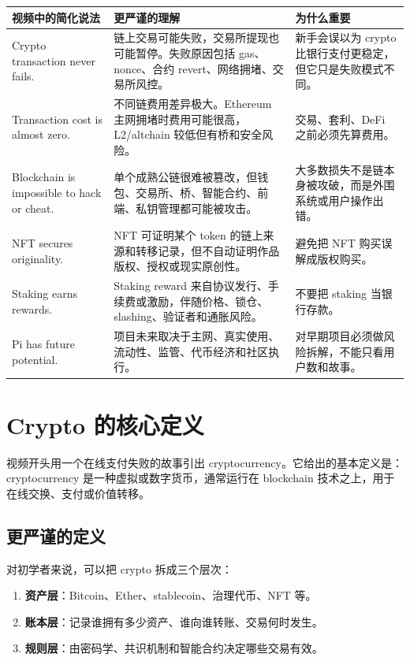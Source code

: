 \documentclass[UTF8,11pt]{ctexart}
\newcommand{\term}[1]{\textbf{\sffamily #1}}
\begin{document}
\begin{longtable}{>{\raggedright\arraybackslash}p{4.2cm}>{\raggedright\arraybackslash}p{5.1cm}>{\raggedright\arraybackslash}p{5cm}}
\toprule
\textbf{视频中的简化说法} & \textbf{更严谨的理解} & \textbf{为什么重要} \\
\midrule
\endhead
Crypto transaction never fails. & 链上交易可能失败，交易所提现也可能暂停。失败原因包括 gas、nonce、合约 revert、网络拥堵、交易所风控。 & 新手会误以为 crypto 比银行支付更稳定，但它只是失败模式不同。 \\
Transaction cost is almost zero. & 不同链费用差异极大。Ethereum 主网拥堵时费用可能很高，L2/altchain 较低但有桥和安全风险。 & 交易、套利、DeFi 之前必须先算费用。 \\
Blockchain is impossible to hack or cheat. & 单个成熟公链很难被篡改，但钱包、交易所、桥、智能合约、前端、私钥管理都可能被攻击。 & 大多数损失不是链本身被攻破，而是外围系统或用户操作出错。 \\
NFT secures originality. & NFT 可证明某个 token 的链上来源和转移记录，但不自动证明作品版权、授权或现实原创性。 & 避免把 NFT 购买误解成版权购买。 \\
Staking earns rewards. & Staking reward 来自协议发行、手续费或激励，伴随价格、锁仓、slashing、验证者和通胀风险。 & 不要把 staking 当银行存款。 \\
Pi has future potential. & 项目未来取决于主网、真实使用、流动性、监管、代币经济和社区执行。 & 对早期项目必须做风险拆解，不能只看用户数和故事。 \\
\bottomrule
\end{longtable}

\section{Crypto 的核心定义}
\label{sec:foundation}

视频开头用一个在线支付失败的故事引出 cryptocurrency。它给出的基本定义是：cryptocurrency 是一种虚拟或数字货币，通常运行在 blockchain 技术之上，用于在线交换、支付或价值转移。

\subsection{更严谨的定义}

对初学者来说，可以把 crypto 拆成三个层次：

\begin{enumerate}
  \item \term{资产层}：Bitcoin、Ether、stablecoin、治理代币、NFT 等。
  \item \term{账本层}：记录谁拥有多少资产、谁向谁转账、交易何时发生。
  \item \term{规则层}：由密码学、共识机制和智能合约决定哪些交易有效。
\end{enumerate}
\end{document}
